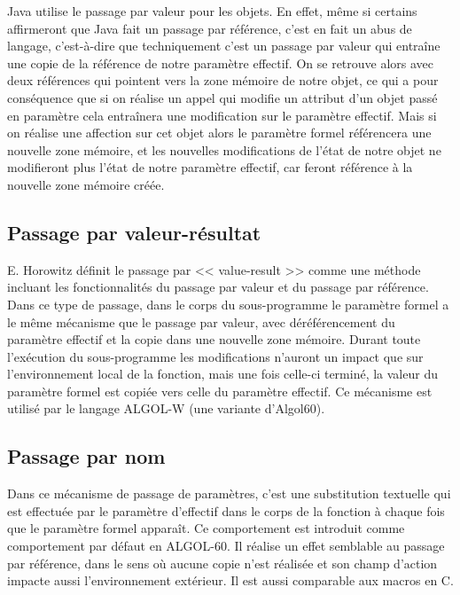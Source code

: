     Java \cite{DBLP:books/aw/ArnoldGH00} utilise le passage par valeur pour les objets. En effet, même si certains affirmeront que Java fait un passage par référence, c'est en fait un abus de langage, c'est-à-dire que techniquement c'est un passage par valeur qui entraîne une copie de la référence de notre paramètre effectif. On se retrouve alors avec deux références qui pointent vers la zone mémoire de notre objet, ce qui a pour conséquence que si on réalise un appel qui modifie un attribut d'un objet passé en paramètre cela entraînera une modification sur le paramètre effectif. Mais si on réalise une affection sur cet objet alors le paramètre formel référencera une nouvelle zone mémoire, et les nouvelles modifications de l'état de notre objet ne modifieront plus l'état de notre paramètre effectif, car feront référence à la nouvelle zone mémoire créée. 
      
    \subsection{Passage par valeur-résultat}
    
    E. Horowitz définit le passage par << value-result >> \cite{DBLP:books/daglib/0069787} comme une méthode incluant les fonctionnalités du passage par valeur et du passage par référence. Dans ce type de passage, dans le corps du sous-programme le paramètre formel a le même mécanisme que le passage par valeur, avec déréférencement du paramètre effectif et la copie dans une nouvelle zone mémoire. Durant toute l'exécution du sous-programme les modifications n'auront un impact que sur l'environnement local de la fonction, mais une fois celle-ci terminé, la valeur du paramètre formel est copiée vers celle du paramètre effectif. Ce mécanisme est utilisé par le langage ALGOL-W \cite{sites1972algol} (une variante d'Algol60).
    
    \subsection{Passage par nom}
    
  Dans ce mécanisme de passage de paramètres, c'est une substitution textuelle qui est effectuée par le paramètre d'effectif dans le corps de la fonction à chaque fois que le paramètre formel apparaît. Ce comportement est introduit comme comportement par défaut en ALGOL-60. Il réalise un effet semblable au passage par référence, dans le sens où aucune copie n'est réalisée et son champ d'action impacte aussi l’environnement extérieur. Il est aussi comparable aux macros en C.
    
